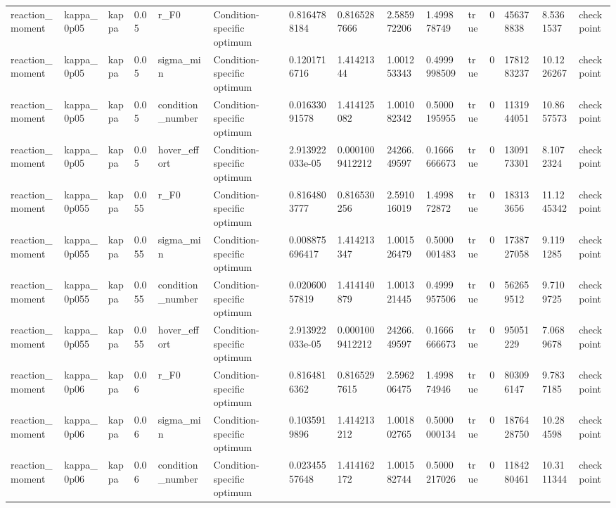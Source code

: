 \begin{tabular}{@{}lllllllllllllll@{}}
reaction\_moment & kappa\_0p05 & kappa & 0.05 & r\_F0 & Condition-specific optimum & 0.8164788184 & 0.8165287666 & 2.585972206 & 1.499878749 & true & 0 & 456378838 & 8.5361537 & checkpoint \\
reaction\_moment & kappa\_0p05 & kappa & 0.05 & sigma\_min & Condition-specific optimum & 0.1201716716 & 1.41421344 & 1.001253343 & 0.4999998509 & true & 0 & 1781283237 & 10.1226267 & checkpoint \\
reaction\_moment & kappa\_0p05 & kappa & 0.05 & condition\_number & Condition-specific optimum & 0.01633091578 & 1.414125082 & 1.001082342 & 0.5000195955 & true & 0 & 1131944051 & 10.8657573 & checkpoint \\
reaction\_moment & kappa\_0p05 & kappa & 0.05 & hover\_effort & Condition-specific optimum & 2.913922033e-05 & 0.0001009412212 & 24266.49597 & 0.1666666673 & true & 0 & 1309173301 & 8.1072324 & checkpoint \\
reaction\_moment & kappa\_0p055 & kappa & 0.055 & r\_F0 & Condition-specific optimum & 0.8164803777 & 0.816530256 & 2.591016019 & 1.499872872 & true & 0 & 183133656 & 11.1245342 & checkpoint \\
reaction\_moment & kappa\_0p055 & kappa & 0.055 & sigma\_min & Condition-specific optimum & 0.008875696417 & 1.414213347 & 1.001526479 & 0.5000001483 & true & 0 & 1738727058 & 9.1191285 & checkpoint \\
reaction\_moment & kappa\_0p055 & kappa & 0.055 & condition\_number & Condition-specific optimum & 0.02060057819 & 1.414140879 & 1.001321445 & 0.4999957506 & true & 0 & 562659512 & 9.7109725 & checkpoint \\
reaction\_moment & kappa\_0p055 & kappa & 0.055 & hover\_effort & Condition-specific optimum & 2.913922033e-05 & 0.0001009412212 & 24266.49597 & 0.1666666673 & true & 0 & 95051229 & 7.0689678 & checkpoint \\
reaction\_moment & kappa\_0p06 & kappa & 0.06 & r\_F0 & Condition-specific optimum & 0.8164816362 & 0.8165297615 & 2.596206475 & 1.499874946 & true & 0 & 803096147 & 9.7837185 & checkpoint \\
reaction\_moment & kappa\_0p06 & kappa & 0.06 & sigma\_min & Condition-specific optimum & 0.1035919896 & 1.414213212 & 1.001802765 & 0.5000000134 & true & 0 & 1876428750 & 10.284598 & checkpoint \\
reaction\_moment & kappa\_0p06 & kappa & 0.06 & condition\_number & Condition-specific optimum & 0.02345557648 & 1.414162172 & 1.001582744 & 0.5000217026 & true & 0 & 1184280461 & 10.3111344 & checkpoint \\

\end{tabular}
